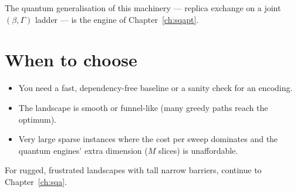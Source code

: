 The quantum generalisation of this machinery --- replica exchange on a joint
$(\beta,\Gamma)$ ladder --- is the  engine of
Chapter~\ref{ch:sqapt}.

\section{When to choose }

\begin{itemize}
\item You need a fast, dependency-free baseline or a sanity check for an
encoding.
\item The landscape is smooth or funnel-like (many greedy paths reach the
optimum).
\item Very large sparse instances where the cost per sweep dominates and the
quantum engines' extra dimension ($M$ slices) is unaffordable.
\end{itemize}

For rugged, frustrated landscapes with tall narrow barriers, continue to
Chapter~\ref{ch:sqa}.

